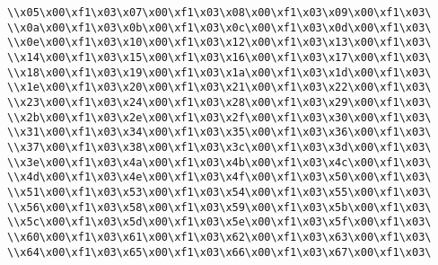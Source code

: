 \verb|\\x05\x00\xf1\x03\x07\x00\xf1\x03\x08\x00\xf1\x03\x09\x00\xf1\x03\|\newline
\verb|\\x0a\x00\xf1\x03\x0b\x00\xf1\x03\x0c\x00\xf1\x03\x0d\x00\xf1\x03\|\newline
\verb|\\x0e\x00\xf1\x03\x10\x00\xf1\x03\x12\x00\xf1\x03\x13\x00\xf1\x03\|\newline
\verb|\\x14\x00\xf1\x03\x15\x00\xf1\x03\x16\x00\xf1\x03\x17\x00\xf1\x03\|\newline
\verb|\\x18\x00\xf1\x03\x19\x00\xf1\x03\x1a\x00\xf1\x03\x1d\x00\xf1\x03\|\newline
\verb|\\x1e\x00\xf1\x03\x20\x00\xf1\x03\x21\x00\xf1\x03\x22\x00\xf1\x03\|\newline
\verb|\\x23\x00\xf1\x03\x24\x00\xf1\x03\x28\x00\xf1\x03\x29\x00\xf1\x03\|\newline
\verb|\\x2b\x00\xf1\x03\x2e\x00\xf1\x03\x2f\x00\xf1\x03\x30\x00\xf1\x03\|\newline
\verb|\\x31\x00\xf1\x03\x34\x00\xf1\x03\x35\x00\xf1\x03\x36\x00\xf1\x03\|\newline
\verb|\\x37\x00\xf1\x03\x38\x00\xf1\x03\x3c\x00\xf1\x03\x3d\x00\xf1\x03\|\newline
\verb|\\x3e\x00\xf1\x03\x4a\x00\xf1\x03\x4b\x00\xf1\x03\x4c\x00\xf1\x03\|\newline
\verb|\\x4d\x00\xf1\x03\x4e\x00\xf1\x03\x4f\x00\xf1\x03\x50\x00\xf1\x03\|\newline
\verb|\\x51\x00\xf1\x03\x53\x00\xf1\x03\x54\x00\xf1\x03\x55\x00\xf1\x03\|\newline
\verb|\\x56\x00\xf1\x03\x58\x00\xf1\x03\x59\x00\xf1\x03\x5b\x00\xf1\x03\|\newline
\verb|\\x5c\x00\xf1\x03\x5d\x00\xf1\x03\x5e\x00\xf1\x03\x5f\x00\xf1\x03\|\newline
\verb|\\x60\x00\xf1\x03\x61\x00\xf1\x03\x62\x00\xf1\x03\x63\x00\xf1\x03\|\newline
\verb|\\x64\x00\xf1\x03\x65\x00\xf1\x03\x66\x00\xf1\x03\x67\x00\xf1\x03\|\newline
